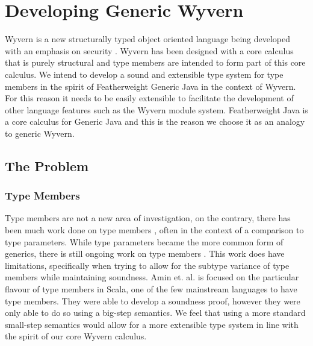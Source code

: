 \documentclass[11pt
              , a4paper
              , twoside
              , openright
              ]{report}
\numberwithin{case}{theorem}
\numberwithin{subcase}{case}
\begin{document}
\section{Developing Generic Wyvern}

Wyvern is a new structurally typed object oriented language being developed with an emphasis on security \cite{Omar2014}. Wyvern has been designed with a core calculus that is purely structural and type members are intended to form part of this core calculus. We intend to develop a sound and extensible type system for type members in the spirit of Featherweight Generic Java \cite{Igarashi:2001:FJM:503502.503505} in the context of Wyvern. For this reason it needs to be easily extensible to facilitate the development of other language features such as the Wyvern module system. Featherweight Java is a core calculus for Generic Java and this is the reason we choose it as an analogy to generic Wyvern.

\subsection{The Problem}

\subsubsection{Type Members}


Type members are not a new area of investigation, on the contrary, there has been much work done on type members \cite{Madsen:1989:VCP:74877.74919, Igarashi1999, Thorup97genericityin, Bruce:1998:SSA:646155.679691}, often in the context of a comparison to type parameters. While type parameters became the more common form of generics, there is still ongoing work on type members \cite{Odersky2003, Amin:2014:FPT:2660193.2660216, amin:fool:2012}.  This work does have limitations, specifically when trying to allow for the subtype variance of type members while maintaining soundness. Amin et. al. \cite{Amin:2014:FPT:2660193.2660216, amin:fool:2012} is focused on the particular flavour of type members in Scala, one of the few mainstream languages to have type members. They were able to develop a soundness proof, however they were only able to do so using a big-step semantics. We feel that using a more standard small-step semantics would allow for a more extensible type system in line with the spirit of our core Wyvern calculus.
\end{document}
